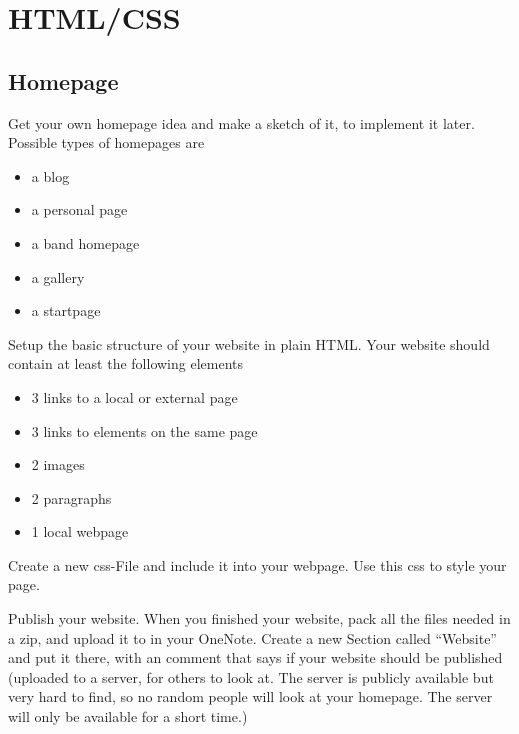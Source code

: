 \documentclass[11pt,a4paper]{report}
\begin{document}
\section{HTML/CSS}

\subsection{Homepage}

\begin{ex}
    Get your own homepage idea and make a sketch of it, to implement it later.
    Possible types of homepages are

    \begin{itemize}
        \item a blog
        \item a personal page
        \item a band homepage
        \item a gallery
        \item a startpage
    \end{itemize}
\end{ex}

\begin{ex}
    Setup the basic structure of your website in plain HTML. Your website
    should contain at least the following elements

    \begin{itemize}
        \item 3 links to a local or external page
        \item 3 links to elements on the same page
        \item 2 images
        \item 2 paragraphs
        \item 1 local webpage
    \end{itemize}
\end{ex}

\begin{ex}
    Create a new css-File and include it into your webpage. Use this css to
    style your page.
\end{ex}

\begin{ex}
    Publish your website. When you finished your website, pack all the files
    needed in a zip, and upload it to in your OneNote. Create a new Section
    called ``Website'' and put it there, with an comment that says if your
    website should be published (uploaded to a server, for others to look at.
    The server is publicly available but very hard to find, so no random people
    will look at your homepage. The server will only be available for a short
    time.)
\end{ex}
\end{document}
